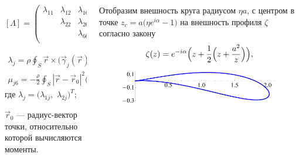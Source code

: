 \documentclass[ignoreonframetext,unicode]{beamer}
\begin{document}
\begin{frame}
	\begin{columns}
		\begin{column}{0.65\textwidth}
			\[
			[\Lambda]=
			\begin{pmatrix}
			\lambda_{11} & \lambda_{12} & \lambda_{16} \\
			& \lambda_{22} & \lambda_{26} \\
			&              & \lambda_{66} \\
			\end{pmatrix}
			\]
			\begin{block}{}
			\begin{gather*}
			\label{addmass}
			{\lambda}_{j} = \rho \oint_S \vec r \times \bigl( \vec\gamma_j(\vec r) + \vec\gamma_j^{att}(\vec r) \bigr)dS,\\[0.4mm]
			\label{addmoment}
			{\mu}_{j 6} = -\frac{\rho}{2} \oint_S |\vec r - \vec r_0|^2 \bigl( \vec\gamma_j(\vec r) + \vec\gamma_j^{att}(\vec r) \bigr)dS,
			\end{gather*}
			где $\lambda_{j} = \bigl(\lambda_{1j},\,\,\lambda_{2j}\bigr)^T$;
				
			$\vec r_0$ --- радиус-вектор точки, относительно которой вычисляются моменты.
			\end{block}
		\end{column}
	\begin{column}{0.4\textwidth}
	Отобразим внешность круга радиусом $\eta a$, с центром в точке $z_c = a\bigl(\eta e^{i \alpha} - 1\bigr)$ на внешность профиля $\zeta$ согласно закону
		\[
		\zeta(z) = e^{-i \alpha} \Bigl(z + \frac12 \Bigl( z + \frac{a^2}{z}\Bigr)\Bigr),
		\]
		\begin{figure}[!h]
			\includegraphics[width=\textwidth]{figWing}
		\end{figure}
	\end{column}
	\end{columns}
\end{frame}
\end{document}
